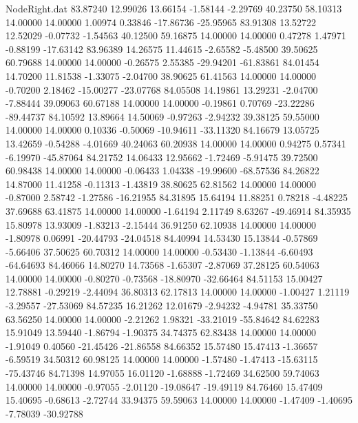 \begin{filecontents}{NodeRight.dat}
  83.87240   12.99026   13.66154    -1.58144   -2.29769   40.23750   58.10313   14.00000   14.00000    1.00974    0.33846  -17.86736  -25.95965
  83.91308   13.52722   12.52029    -0.07732   -1.54563   40.12500   59.16875   14.00000   14.00000    0.47278    1.47971   -0.88199  -17.63142
  83.96389   14.26575   11.44615    -2.65582   -5.48500   39.50625   60.79688   14.00000   14.00000   -0.26575    2.55385  -29.94201  -61.83861
  84.01454   14.70200   11.81538    -1.33075   -2.04700   38.90625   61.41563   14.00000   14.00000   -0.70200    2.18462  -15.00277  -23.07768
  84.05508   14.19861   13.29231    -2.04700   -7.88444   39.09063   60.67188   14.00000   14.00000   -0.19861    0.70769  -23.22286  -89.44737
  84.10592   13.89664   14.50069    -0.97263   -2.94232   39.38125   59.55000   14.00000   14.00000    0.10336   -0.50069  -10.94611  -33.11320
  84.16679   13.05725   13.42659    -0.54288   -4.01669   40.24063   60.20938   14.00000   14.00000    0.94275    0.57341   -6.19970  -45.87064
  84.21752   14.06433   12.95662    -1.72469   -5.91475   39.72500   60.98438   14.00000   14.00000   -0.06433    1.04338  -19.99600  -68.57536
  84.26822   14.87000   11.41258    -0.11313   -1.43819   38.80625   62.81562   14.00000   14.00000   -0.87000    2.58742   -1.27586  -16.21955
  84.31895   15.64194   11.88251     0.78218   -4.48225   37.69688   63.41875   14.00000   14.00000   -1.64194    2.11749    8.63267  -49.46914
  84.35935   15.80978   13.93009    -1.83213   -2.15444   36.91250   62.10938   14.00000   14.00000   -1.80978    0.06991  -20.44793  -24.04518
  84.40994   14.53430   15.13844    -0.57869   -5.66406   37.50625   60.70312   14.00000   14.00000   -0.53430   -1.13844   -6.60493  -64.64693
  84.46066   14.80270   14.73568    -1.65307   -2.87069   37.28125   60.54063   14.00000   14.00000   -0.80270   -0.73568  -18.80970  -32.66464
  84.51153   15.00427   12.78881    -0.29219   -2.44094   36.80313   62.17813   14.00000   14.00000   -1.00427    1.21119   -3.29557  -27.53069
  84.57235   16.21262   12.01679    -2.94232   -4.94781   35.33750   63.56250   14.00000   14.00000   -2.21262    1.98321  -33.21019  -55.84642
  84.62283   15.91049   13.59440    -1.86794   -1.90375   34.74375   62.83438   14.00000   14.00000   -1.91049    0.40560  -21.45426  -21.86558
  84.66352   15.57480   15.47413    -1.36657   -6.59519   34.50312   60.98125   14.00000   14.00000   -1.57480   -1.47413  -15.63115  -75.43746
  84.71398   14.97055   16.01120    -1.68888   -1.72469   34.62500   59.74063   14.00000   14.00000   -0.97055   -2.01120  -19.08647  -19.49119
  84.76460   15.47409   15.40695    -0.68613   -2.72744   33.94375   59.59063   14.00000   14.00000   -1.47409   -1.40695   -7.78039  -30.92788

\end{filecontents}
